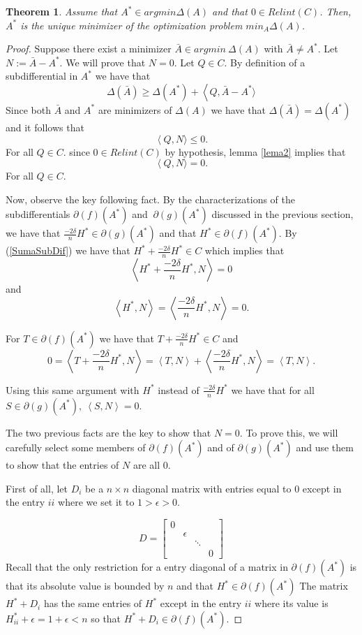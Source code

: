 \documentclass[12pt]{amsart}
\newtheorem{theorem}[lemma]{Theorem}
\theoremstyle{remark}
\begin{document}
\begin{theorem}
Assume that $A^* \in argmin \Delta(A)$ and that $0 \in Relint(C)$. Then, $A^*$ is the unique minimizer of the optimization problem $min_A\Delta(A)$.
\end{theorem}
\begin{proof}
Suppose there exist a minimizer $\bar{A} \in argmin \ \Delta(A)$ with $\bar{A} \neq A^*$.
Let $N:=\bar{A}-A^* $. We will prove that $N=0$.
Let $Q \in C$. By definition of a subdifferential in $A^*$ we have that
\[
\Delta(\bar{A}) \geq \Delta(A^*) + \left \langle Q,  \bar{A}-A^* \rangle \right.
\]
Since both $\bar{A}$ and $A^*$ are minimizers of $\Delta(A)$ we have that $\Delta(\bar{A})=\Delta(A^*)$ and it follows that
\[
\left \langle Q,N \rangle \right. \leq 0.
\]
For all $Q \in C$. since $0 \in Relint(C)$ by hypothesis,  lemma \ref{lema2} implies that 
\[
\left \langle Q,N \rangle \right. = 0.
\]
For all $Q \in C$.

Now, observe the key following fact. By the characterizations of the subdifferentials $ \partial(f)(A^*) $ and $ \ \partial(g)(A^*)$ discussed in the previous section, we have that $\frac{-2\delta}{n}H^*  \in \partial(g)(A^*) $ and that $H^* \in \partial(f)(A^*)$. By (\ref{SumaSubDif}) we have that $H^*+\frac{-2\delta}{n}H^* \in C$ which implies that
\[
\left \langle H^* + \frac{-2\delta}{n}H^*,N \right\rangle= 0
\]
and 
\[
\left \langle H^*,N \right\rangle = \left \langle \frac{-2\delta}{n}H^*,N \right\rangle = 0.
\]

For $T \in \partial(f)(A^*)$ we have that $T+ \frac{-2\delta}{n}H^* \in C$ and
\[
0 = \left \langle T+ \frac{-2\delta}{n}H^*,N \right\rangle = \left \langle T,N \right\rangle + \left \langle \frac{-2\delta}{n}H^*,N \right\rangle =  \left \langle T,N \right\rangle.
\]

Using this same argument with $H^*$ instead of $\frac{-2\delta}{n}H^*$ we have that for all $S \in \partial(g)(A^*), \ \left \langle S,N \right\rangle =0.$

The two previous facts are the key to show that $N=0$. To prove this, we will carefully select some members of $\partial(f)(A^*)$ and of $\partial(g)(A^*)$ and use them to show that the entries of $N$ are all $0$.

First of all, let $D_i$ be a $n \times n$ diagonal matrix with  entries equal to 0 except in the entry $ii$ where we set it to $1>\epsilon>0$.

\[
D = 
 \begin{bmatrix}
    0 & & & \\
   & \epsilon  & \\
   & &\ddots & \\
   &  & & 0
  \end{bmatrix}
\]
Recall that the only restriction for a entry diagonal of a matrix in $\partial(f)(A^*)$ is that its absolute value is bounded by $n$ and that $H^* \in \partial(f)(A^*)$
The matrix $H^* + D_i$ has the same entries of $H^*$ except in the entry $ii$ where its value is $H^*_{ii}+ \epsilon = 1+\epsilon<n$ so that $H^* + D_i\in \partial(f)(A^*)$. 


\end{proof}
\end{document}
